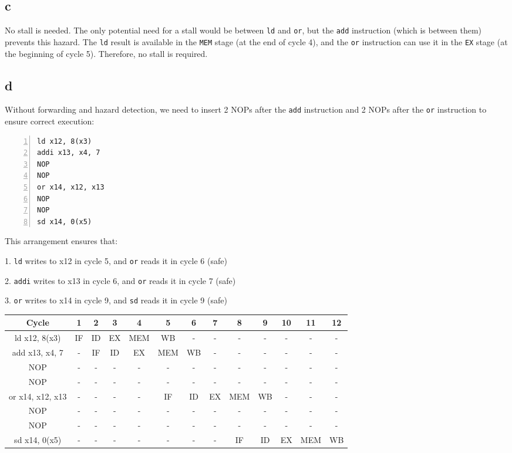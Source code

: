 \documentclass[12pt]{article}
\begin{document}
\subsection*{c}
No stall is needed. The only potential need for a stall would be between \texttt{ld} and \texttt{or}, but the \texttt{add} instruction (which is between them) prevents this hazard. The \texttt{ld} result is available in the \texttt{MEM} stage (at the end of cycle 4), and the \texttt{or} instruction can use it in the \texttt{EX} stage (at the beginning of cycle 5). Therefore, no stall is required.

\subsection*{d}
Without forwarding and hazard detection, we need to insert 2 NOPs after the \texttt{add} instruction and 2 NOPs after the \texttt{or} instruction to ensure correct execution:

\begin{lstlisting}[basicstyle=\ttfamily\small, numbers=left, numberstyle=\tiny\color{gray}, stepnumber=1, frame=single]
ld x12, 8(x3)
addi x13, x4, 7
NOP
NOP
or x14, x12, x13
NOP
NOP
sd x14, 0(x5)
\end{lstlisting}

This arrangement ensures that:

1. \texttt{ld} writes to x12 in cycle 5, and \texttt{or} reads it in cycle 6 (safe)

2. \texttt{addi} writes to x13 in cycle 6, and \texttt{or} reads it in cycle 7 (safe)

3. \texttt{or} writes to x14 in cycle 9, and \texttt{sd} reads it in cycle 9 (safe)

\begin{table}[h!]
    \centering
    \begin{tabular}{|c|c|c|c|c|c|c|c|c|c|c|c|c|}
    \hline
    Cycle & 1 & 2 & 3 & 4 & 5 & 6 & 7 & 8 & 9 & 10 & 11 & 12 \\
    \hline
    ld x12, 8(x3)    & IF & ID & EX & MEM & WB & - & - & - & - & - & - & - \\
    add x13, x4, 7   & - & IF & ID & EX & MEM & WB & - & - & - & - & - & - \\
    NOP              & - & - & - & - & - & - & - & - & - & - & - & - \\
    NOP              & - & - & - & - & - & - & - & - & - & - & - & - \\
    or x14, x12, x13 & - & - & - & - & IF & ID & EX & MEM & WB & - & - & - \\
    NOP              & - & - & - & - & - & - & - & - & - & - & - & - \\
    NOP              & - & - & - & - & - & - & - & - & - & - & - & - \\
    sd x14, 0(x5)    & - & - & - & - & - & - & - & IF & ID & EX & MEM & WB \\
    \hline
    \end{tabular}
\end{table}
\end{document}
